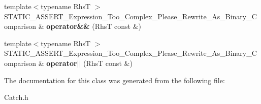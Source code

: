 \begin{DoxyCompactItemize}
\item 
\hypertarget{class_catch_1_1_expression_result_builder_a23c8da24256b37ac32fad19d3acee5c4}{{\footnotesize template$<$typename Rhs\-T $>$ }\\S\-T\-A\-T\-I\-C\-\_\-\-A\-S\-S\-E\-R\-T\-\_\-\-Expression\-\_\-\-Too\-\_\-\-Complex\-\_\-\-Please\-\_\-\-Rewrite\-\_\-\-As\-\_\-\-Binary\-\_\-\-Comparison \& {\bfseries operator\&\&} (Rhs\-T const \&)}\label{class_catch_1_1_expression_result_builder_a23c8da24256b37ac32fad19d3acee5c4}

\item 
\hypertarget{class_catch_1_1_expression_result_builder_a72bf498d09ede40cd0bd74633f9623b7}{{\footnotesize template$<$typename Rhs\-T $>$ }\\S\-T\-A\-T\-I\-C\-\_\-\-A\-S\-S\-E\-R\-T\-\_\-\-Expression\-\_\-\-Too\-\_\-\-Complex\-\_\-\-Please\-\_\-\-Rewrite\-\_\-\-As\-\_\-\-Binary\-\_\-\-Comparison \& {\bfseries operator$|$$|$} (Rhs\-T const \&)}\label{class_catch_1_1_expression_result_builder_a72bf498d09ede40cd0bd74633f9623b7}

\end{DoxyCompactItemize}


The documentation for this class was generated from the following file\-:\begin{DoxyCompactItemize}
\item 
Catch.\-h\end{DoxyCompactItemize}

